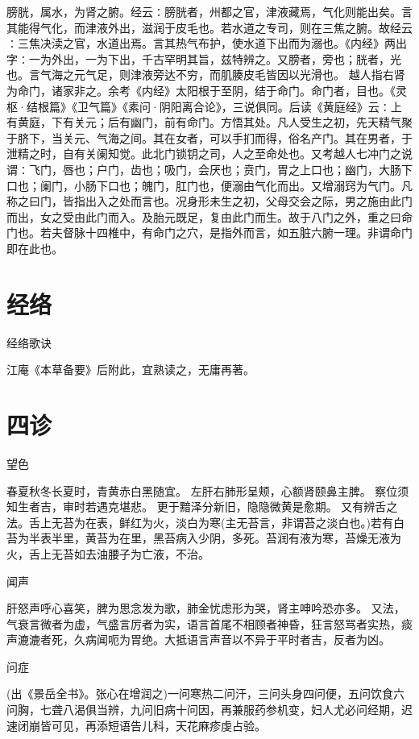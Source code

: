 \documentclass[a4paper,12pt,UTF8,twoside]{ctexbook}
\begin{document}
	膀胱，属水，为肾之腑。经云∶膀胱者，州都之官，津液藏焉，气化则能出矣。言其能得气化，而津液外出，滋润于皮毛也。若水道之专司，则在三焦之腑。故经云∶三焦决渎之官，水道出焉。言其热气布护，使水道下出而为溺也。《内经》两出字∶一为外出，一为下出，千古罕明其旨，兹特辨之。又膀者，旁也；胱者，光也。言气海之元气足，则津液旁达不穷，而肌腠皮毛皆因以光滑也。
	越人指右肾为命门，诸家非之。余考《内经》太阳根于至阴，结于命门。命门者，目也。《灵枢·结根篇》《卫气篇》《素问·阴阳离合论》，三说俱同。后读《黄庭经》云∶上有黄庭，下有关元；后有幽门，前有命门。方悟其处。凡人受生之初，先天精气聚于脐下，当关元、气海之间。其在女者，可以手扪而得，俗名产门。其在男者，于泄精之时，自有关阑知觉。此北门锁钥之司，人之至命处也。又考越人七冲门之说谓∶飞门，唇也；户门，齿也；吸门，会厌也；贲门，胃之上口也；幽门，大肠下口也；阑门，小肠下口也；魄门，肛门也，便溺由气化而出。又增溺窍为气门。凡称之曰门，皆指出入之处而言也。况身形未生之初，父母交会之际，男之施由此门而出，女之受由此门而入。及胎元既足，复由此门而生。故于八门之外，重之曰命门也。若夫督脉十四椎中，有命门之穴，是指外而言，如五脏六腑一理。非谓命门即在此也。
	
	\chapter{经络}
  经络歌诀

	江庵《本草备要》后附此，宜熟读之，无庸再著。
	
	\chapter{四诊}
	望色

	春夏秋冬长夏时，青黄赤白黑随宜。
	左肝右肺形呈颊，心额肾颐鼻主脾。
	察位须知生者吉，审时若遇克堪悲。
	更于黯泽分新旧，隐隐微黄是愈期。
	又有辨舌之法。舌上无苔为在表，鲜红为火，淡白为寒(主无苔言，非谓苔之淡白也。)若有白苔为半表半里，黄苔为在里，黑苔病入少阴，多死。苔润有液为寒，苔燥无液为火，舌上无苔如去油腰子为亡液，不治。

	闻声
  
	肝怒声呼心喜笑，脾为思念发为歌，肺金忧虑形为哭，肾主呻吟恐亦多。
	又法，气衰言微者为虚，气盛言厉者为实，语言首尾不相顾者神昏，狂言怒骂者实热，痰声漉漉者死，久病闻呃为胃绝。大抵语言声音以不异于平时者吉，反者为凶。
		
	问症

	(出《景岳全书》。张心在增润之)一问寒热二问汗，三问头身四问便，五问饮食六问胸，七聋八渴俱当辨，九问旧病十问因，再兼服药参机变，妇人尤必问经期，迟速闭崩皆可见，再添短语告儿科，天花麻疹虔占验。
		
\end{document}
